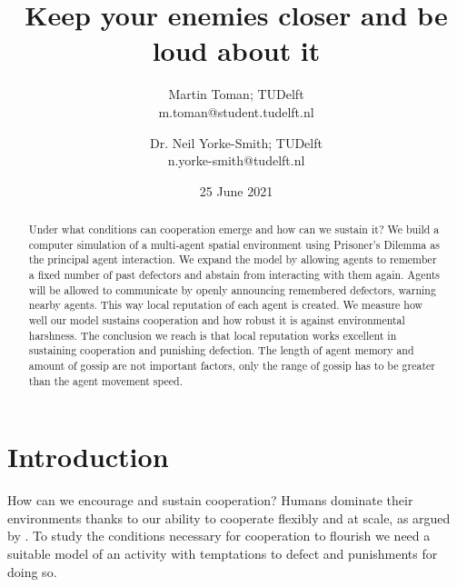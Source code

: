 \documentclass[english]{article}
\begin{document}

\title{Keep your enemies closer and be loud about it}
\author{
  Martin Toman; TUDelft
  \\
  m.toman@student.tudelft.nl
\and
  Dr. Neil Yorke-Smith; TUDelft
  \\
  n.yorke-smith@tudelft.nl
}
\date{25 June 2021}
\maketitle


\begin{abstract}

Under what conditions can cooperation emerge and how can we sustain it?
We build a computer simulation of a multi-agent spatial environment using Prisoner's Dilemma as the principal agent interaction.
We expand the model by allowing agents to remember a fixed number of past defectors
and abstain from interacting with them again.
Agents will be allowed to communicate by openly announcing remembered defectors, warning nearby agents.
This way local reputation of each agent is created.
We measure how well our model sustains cooperation and how robust it is against environmental harshness.
The conclusion we reach is that local reputation works excellent in sustaining cooperation and punishing defection.
The length of agent memory and amount of gossip are not important factors,
only the range of gossip has to be greater than the agent movement speed.

\end{abstract}



\section{Introduction}

How can we encourage and sustain cooperation? Humans dominate their environments thanks to our ability to cooperate flexibly and at scale, as argued by \citet{harari-sapiens}.
To study the conditions necessary for cooperation to flourish we need a suitable model of an activity with temptations to defect and punishments for doing so.
\end{document}
